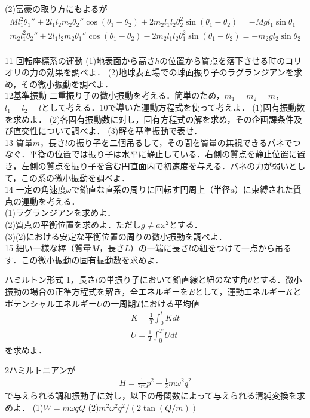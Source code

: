\documentclass[a4j]{jarticle}
\begin{document}
(2)富豪の取り方にもよるが
\begin{align*}
 Ml_1^2\theta_1''+2l_1l_2m_2\theta_2''\cos (\theta_1-\theta_2)+2m_2l_1l_2\theta_2^2\sin (\theta_1-\theta_2)=-Mgl_1\sin\theta_1 \\
  m_2l_1^2\theta_2''+2l_1l_2m_2\theta_1''\cos (\theta_1-\theta_2)-2m_2l_1l_2\theta_1^2\sin (\theta_1-\theta_2)=-m_2gl_2\sin\theta_2 \\
\end{align*}


11 回転座標系の運動
(1)地表面から高さ$h$の位置から質点を落下させる時のコリオリの力の効果を調べよ．
(2)地球表面場での球面振り子のラグランジアンを求め，その微小振動を調べよ．\\

12基準振動
二重振り子の微小振動を考える．簡単のため，$m_1=m_2=m$，$l_1=l_2=l$として考える．10で導いた運動方程式を使って考えよ．
(1)固有振動数を求めよ．
(2)各固有振動数に対し，固有方程式の解を求め，その企画課条件及び直交性について調べよ．
(3)解を基準振動で表せ．\\


13
質量$m$，長さ$l$の振り子を二個吊るして，その間を質量の無視できるバネでつなぐ．平衡の位置では振り子は水平に静止している．右側の質点を静止位置に置き，左側の質点を振り子を含む円直面内で初速度を与える．バネの力が弱いとして，この系の微小振動を調べよ．\\

14
一定の角速度$\omega$で鉛直な直系の周りに回転す円周上（半径$a$）に束縛された質点の運動を考える．\\
(1)ラグランジアンを求めよ．\\
(2)質点の平衡位置を求めよ．ただし$g\not=a\omega^2$とする．\\
(3)(2)における安定な平衡位置の周りの微小振動を調べよ．\\

15
細い一様な棒（質量$M$，長さ$L$）の一端に長さ$l$の紐をつけて一点から吊るす．この微小振動の固有振動数を求めよ．


ハミルトン形式
1，長さ$l$の単振り子において鉛直線と紐のなす角$\theta$とする．微小振動の場合の正準方程式を解き，全エネルギーを$E$として，運動エネルギー$K$とポテンシャルエネルギー$U$の一周期$T$における平均値
\begin{align*}
 K=\frac{1}{T}\int_{0}^{t}Kdt\\
 U=\frac{1}{T}\int_{0}^{T}Udt
\end{align*}
を求めよ．

2ハミルトニアンが
\begin{align*}
 H=\frac{1}{2m}p^2+\frac{1}{2}m\omega^2q^2
\end{align*}
で与えられる調和振動子に対し，以下の母関数によって与えられる清純変換を求めよ．
(1)$W=m\omega qQ$ (2)$m^2\omega^2q^2/(2\tan (Q/m))$
\end{document}

